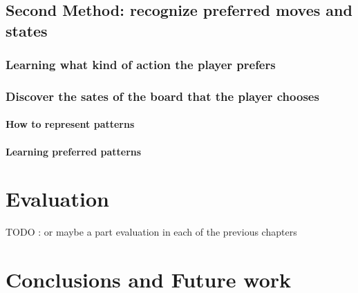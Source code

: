 \documentclass[12pt,twoside]{report}
\begin{document}
\section{Second Method: recognize preferred moves and states}

\subsection{Learning what kind of action the player prefers}

\subsection{Discover the sates of the board that the player chooses}




\subsubsection{How to represent patterns}



\subsubsection{Learning preferred patterns}






\chapter{Evaluation}

TODO : or maybe a part evaluation in each of the previous chapters

\chapter{Conclusions and Future work}
\end{document}
